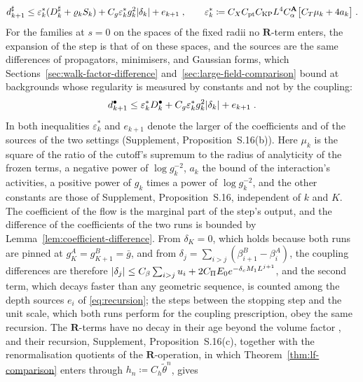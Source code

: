 \documentclass[11pt]{preprint}
\DeclarePairedDelimiter{\abs}{\lvert}{\rvert}
\numberwithin{equation}{section}
\theoremstyle{definition}
\theoremstyle{remark}
\theoremstyle{plain}
\begin{document}
\begin{equation}\label{eq:recursion}
    d^\sharp_{k+1} \leq \varepsilon^*_k(D^\sharp_k + \varrho_kS_k) + C_g\varepsilon^*_kg_k^2\abs{\delta_k} + e_{k+1}\;,
    \qquad
    \varepsilon^*_k \coloneqq C_XC_{\mathrm{pt}}C_{\mathrm{KP}}L^4C^{\mathbf A}_\alpha\bigl[C_T\mu_k + 4a_k\bigr]\;.
\end{equation}
For the families at $s = 0$ on the spaces of the fixed radii no $\mathbf R$-term enters, the expansion of the step is that of \cite[Sect.~2]{BalabanRG2} on these spaces, and the sources are the same differences of propagators, minimisers, and Gaussian forms, which Sections~\ref{sec:walk-factor-difference} and~\ref{sec:large-field-comparison} bound at backgrounds whose regularity is measured by constants and not by the coupling:
\begin{equation}\label{eq:recursion-fixed}
    d^\bullet_{k+1} \leq \varepsilon^*_kD^\bullet_k + C_g\varepsilon^*_kg_k^2\abs{\delta_k} + e_{k+1}\;.
\end{equation}
In both inequalities $\varepsilon^*_k$ and $e_{k+1}$ denote the larger of the coefficients and of the sources of the two settings (Supplement, Proposition~S.16(b)). Here $\mu_k$ is the square of the ratio of the cutoff's supremum to the radius of analyticity of the frozen terms, a negative power of $\log g_k^{-2}$, $a_k$ the bound of the interaction's activities, a positive power of $g_k$ times a power of $\log g_k^{-2}$, and the other constants are those of Supplement, Proposition~S.16, independent of $k$ and $K$. The coefficient of the flow is the marginal part of the step's output, and the difference of the coefficients of the two runs is bounded by Lemma~\ref{lem:coefficient-difference}. From $\delta_K = 0$, which holds because both runs are pinned at $g^A_K = g^B_{K+1} = \bar g$, and from $\delta_j = \sum_{i > j}(\beta^B_{i+1} - \beta^A_i)$, the coupling differences are therefore $\abs{\delta_j} \leq C_\beta\sum_{i > j}u_i + 2C_\Pi E_0e^{-\delta_cM_1L^{j+1}}$, and the second term, which decays faster than any geometric sequence, is counted among the depth sources $e_i$ of \eqref{eq:recursion}; the steps between the stopping step and the unit scale, which both runs perform for the coupling prescription, obey the same recursion. The $\mathbf R$-terms have no decay in their age beyond the volume factor \cite[p.~283]{BalabanCRE}, and their recursion, Supplement, Proposition~S.16(c), together with the renormalisation quotients of the $\mathbf R$-operation, in which Theorem~\ref{thm:lf-comparison} enters through $h_n \coloneqq C_h\tilde\theta^n$, gives
\end{document}
